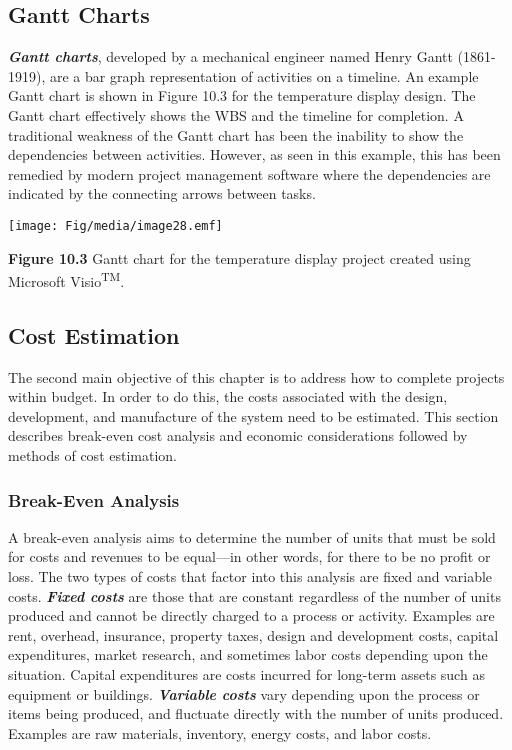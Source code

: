 \subsection{Gantt Charts}\label{gantt-charts}

\emph{\textbf{Gantt charts}}, developed by a mechanical engineer named
Henry Gantt (1861-1919), are a bar graph representation of activities on
a timeline. An example Gantt chart is shown in Figure 10.3 for the
temperature display design. The Gantt chart effectively shows the WBS
and the timeline for completion. A traditional weakness of the Gantt
chart has been the inability to show the dependencies between
activities. However, as seen in this example, this has been remedied by
modern project management software where the dependencies are indicated
by the connecting arrows between tasks.

\texttt{[image: Fig/media/image28.emf]}

\textbf{Figure 10.3} Gantt chart for the temperature display project
created using Microsoft Visio\textsuperscript{TM}.

\subsection{Cost Estimation}\label{cost-estimation}

The second main objective of this chapter is to address how to complete
projects within budget. In order to do this, the costs associated with
the design, development, and manufacture of the system need to be
estimated. This section describes break-even cost analysis and economic
considerations followed by methods of cost estimation.

\subsubsection{Break-Even Analysis}\label{break-even-analysis}

A break-even analysis aims to determine the number of units that must be
sold for costs and revenues to be equal---in other words, for there to
be no profit or loss. The two types of costs that factor into this
analysis are fixed and variable costs. \emph{\textbf{Fixed costs}} are
those that are constant regardless of the number of units produced and
cannot be directly charged to a process or activity. Examples are rent,
overhead, insurance, property taxes, design and development costs,
capital expenditures, market research, and sometimes labor costs
depending upon the situation. Capital expenditures are costs incurred
for long-term assets such as equipment or buildings.
\emph{\textbf{Variable costs}} vary depending upon the process or items
being produced, and fluctuate directly with the number of units
produced. Examples are raw materials, inventory, energy costs, and labor
costs.

